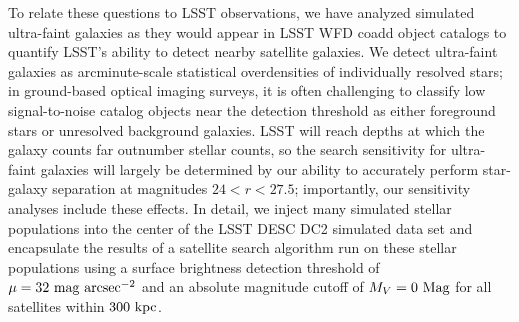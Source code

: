 \documentclass[modern,linenumbers]{aastex62}
\begin{document}
To relate these questions to LSST observations, we have analyzed simulated ultra-faint galaxies as they would appear in LSST WFD coadd object catalogs to quantify LSST's ability to detect nearby satellite galaxies. %
We detect ultra-faint galaxies as arcminute-scale statistical overdensities of individually resolved stars; in ground-based optical imaging surveys, it is often challenging to classify low signal-to-noise catalog objects near the detection threshold as either foreground stars or unresolved background galaxies. LSST will reach depths at which the galaxy counts far outnumber stellar counts, so the search sensitivity for ultra-faint galaxies will largely be determined by our ability to accurately perform star-galaxy separation at magnitudes $24 < r < 27.5$; importantly, our sensitivity analyses include these effects. 
In detail, we inject many simulated stellar populations into the center of the LSST DESC DC2 simulated data set and encapsulate the results of a satellite search algorithm run on these stellar populations using a surface brightness detection threshold of $\mu = 32\ \rm{mag\ arcsec}^{-2}$ and an absolute magnitude cutoff of $M_V = 0\ \rm{Mag}$ for all satellites within $300\ \rm{kpc}$.
\end{document}
